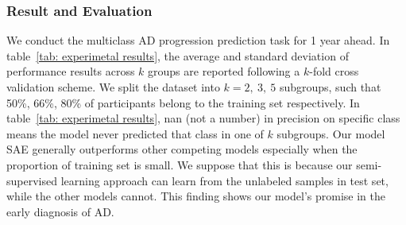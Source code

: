 \subsubsection{Result and Evaluation}
We conduct the multiclass AD progression prediction task for 1 year ahead.
In table~\ref{tab: experimetal results}, the average and standard deviation of performance results across $k$ groups are reported following a $k$-fold cross validation scheme. We split the dataset into $k=2,\ 3,\ 5$ subgroups, such that 50\%, 66\%, 80\% of participants belong to the training set respectively. In table~\ref{tab: experimetal results}, nan (not a number) in precision on specific class means the model never predicted that class in one of $k$ subgroups.
Our model SAE generally outperforms other competing models especially when the proportion of training set is small. We suppose that this is because our semi-supervised learning approach can learn from the unlabeled samples in test set, while the other models cannot. This finding shows our model's promise in the early diagnosis of AD.


